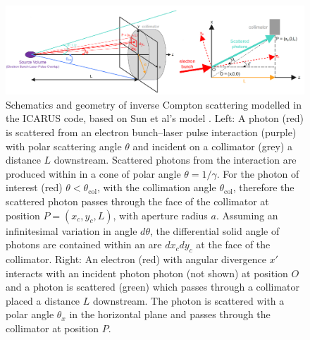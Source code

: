 \documentclass[../main.tex]{subfiles}
\begin{document}
\begin{figure}[!h]
\centering
\includegraphics[width=\textwidth]{Figures/Optimisation_and_Characterisation_of_Inverse_Compton_Scattering_Sources/collimator_geometry_solid_angle.pdf}
\caption{Schematics and geometry of inverse Compton scattering modelled in the \textsc{ICARUS} code, based on Sun et al's model \cite{sun2009characterizations,sun2011theoretical}. Left: A photon (red) is scattered from an electron bunch--laser pulse interaction (purple) with polar scattering angle $\theta$ and incident on a collimator (grey) a distance $L$ downstream. Scattered photons from the interaction are produced within in a cone of polar angle $\theta=1/\gamma$. For the photon of interest (red) $\theta < \theta_{\mathrm{col}}$, with the collimation angle $\theta_{\mathrm{col}}$, therefore the scattered photon passes through the face of the collimator at position $P = \left(x_{c},y_{c},L\right)$, with aperture radius $a$. Assuming an infinitesimal variation in angle $d\theta$, the differential solid angle of photons are contained within an are $dx_{c}dy_{c}$ at the face of the collimator. Right: An electron (red) with angular divergence $x'$ interacts with an incident photon photon (not shown) at position $O$ and a photon is scattered (green) which passes through a collimator placed a distance $L$ downstream. The photon is scattered with a polar angle $\theta_{x}$ in the horizontal plane and passes through the collimator at position $P$.}
\label{fig:solid_angle_collimator_geometry}
\end{figure}
\end{document}

